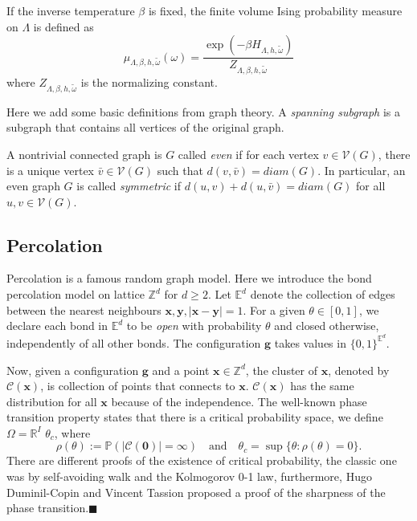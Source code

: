 \documentclass[11pt,english]{smfart}
\newcommand{\mb}{\mathbb}
\newcommand{\mf}{\mathbf}
\newcommand{\xt}{\textit}
\begin{document}
If the inverse temperature $\beta$ is fixed, the finite volume Ising probability measure on $\Lambda$ is defined as 
$$\mu_{\Lambda,\beta,h,\tilde{\omega}}(\omega) = \frac{\exp\left(-\beta H_{\Lambda,h,\tilde{\omega}}\right)}{Z_{\Lambda,\beta,h,\tilde{\omega}}}$$
where $Z_{\Lambda,\beta,h,\tilde{\omega}}$ is the normalizing constant.

Here we add some basic definitions from graph theory. A \textit{spanning subgraph} is a subgraph that contains all vertices of the original graph.

A nontrivial connected graph is $G$ called \textit{even} if for each vertex $v\in \mathcal{V}(G)$, there is a unique vertex $\bar{v} \in \mathcal{V}(G)$ such that $d(v,\bar{v}) = diam(G)$. In particular, an even graph $G$ is called \textit{symmetric} if $d(u,v) + d(u,\bar{v}) = diam(G)$ for all $u,v\in \mathcal{V}(G)$. 

\subsection{Percolation}
Percolation is a famous random graph model. Here we introduce the bond percolation model on lattice $\mb{Z}^d$ for $d\geq 2$. Let $\mb{E}^d$ denote the collection of edges between the nearest neighbours $\mf{x,y},|\mf{x} - \mf{y}| = 1$. For a given $\theta \in [0,1]$, we declare each bond in $\mb{E}^d$ to be \xt{open} with probability $\theta$ and closed otherwise, independently of all other bonds. The configuration $\mf{g}$ takes values in $\{0,1\}^{\mb{E}^d}$.

Now, given a configuration $\mf{g}$ and a point $\mf{x}\in \mb{Z}^d$, the cluster of $\mf{x}$, denoted by $\mathcal{C}(\mf{x})$, is collection of points that connects to $\mf{x}$. $\mathcal{C}(\mf{x})$ has the same distribution for all $\mf{x}$ because of the independence. The well-known phase transition property states that there is a critical probability space, we define $\Omega = \mb{R}^{I}$ $\theta_c$, where  
$$\rho(\theta) := \mathbb{P}\left(|\mathcal{C}(\mf{0})| = \infty\right) \quad \text{and}\quad  \theta_c = \sup\{\theta : \rho(\theta) = 0\}.$$
There are different proofs of the existence of critical probability, the classic one was by self-avoiding walk and the Kolmogorov 0-1 law, furthermore, Hugo Duminil-Copin and Vincent Tassion proposed a proof of the sharpness of the phase transition.$\blacksquare $ 
\end{document}
